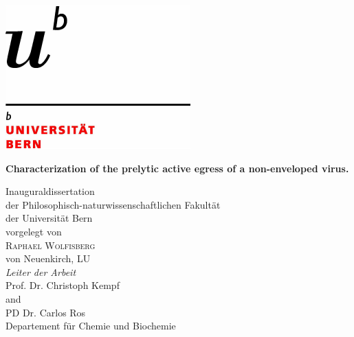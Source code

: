 \documentclass[11pt, titlepage, a4paper, twoside, onecolumn, DIV=calc]{scrbook} %
\begin{document}

\setlength{\footskip}{35mm}


\captionsetup[table]{singlelinecheck=off} %




\begin{titlepage}
\begin{flushright}
\includegraphics[scale=0.3, trim= 1mm 1mm 5mm 20mm]{logo} \\[1.4 cm]
\end{flushright}
\begin{center}
\begin{spacing}{2.5}
{\Huge \bfseries Characterization of the prelytic active egress of a non-enveloped virus.} \\[1.7 cm]
\end{spacing}
{\Large Inauguraldissertation \\
der Philosophisch-naturwissenschaftlichen Fakultät \\
der Universität Bern \\[1.7cm]
{\large vorgelegt von}\\[0.3 cm]
{\LARGE \textsc{Raphael Wolfisberg}} \\[0.3 cm] 
{\large von Neuenkirch, LU} \\ [2 cm]
{\Large \emph{Leiter der Arbeit}\\ [0.3 cm]
{\textsc Prof. Dr. Christoph Kempf} \\
and \\
{\textsc PD Dr. Carlos Ros} \\ [0.9 cm]
Departement für Chemie und Biochemie}}
\end{center}
\end{titlepage}
\end{document}
